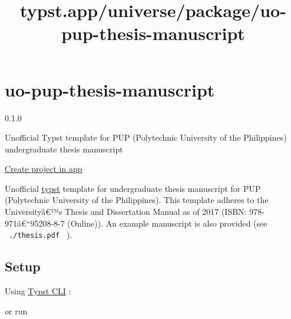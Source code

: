 \title{typst.app/universe/package/uo-pup-thesis-manuscript}

\label{banner}
\label{template-thumbnail}

\section{uo-pup-thesis-manuscript}\label{uo-pup-thesis-manuscript}

{ 0.1.0 }

Unofficial Typst template for PUP (Polytechnic University of the
Philippines) undergraduate thesis manuscript

\href{/app?template=uo-pup-thesis-manuscript&version=0.1.0}{Create
project in app}

\label{readme}
Unofficial \href{https://typst.app/}{typst} template for undergraduate
thesis manuscript for PUP (Polytechnic University of the Philippines).
This template adheres to the Universityâ€™s Thesis and Dissertation
Manual as of 2017 (ISBN: 978-971â€``95208-8-7 (Online)). An example
manuscript is also provided (see \texttt{\ ./thesis.pdf\ } ).

\subsection{Setup}\label{setup}

Using
\href{https://github.com/typst/typst?tab=readme-ov-file\#installation}{Typst
CLI} :

\begin{Shaded}
\begin{Highlighting}[]
\end{Highlighting}
\end{Shaded}

or run

\begin{Shaded}
\begin{Highlighting}[]
\end{Highlighting}
\end{Shaded}

